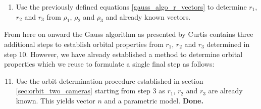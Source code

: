 \documentclass[11pt,a4paper]{article}
\begin{document}
\begin{enumerate}
		\item Use the previously defined equations \ref{gauss_algo_r_vectors} to determine $r_1$, $r_2$ and $r_3$ from $\rho_1$, $\rho_2$ and $\rho_3$ and already known vectors.
	\end{enumerate}
	\cite{curtis_gauss_algo}
	\newline
	From here on onward the Gauss algorithm as presented by Curtis contains three additional steps to establish orbital properties from $r_1$, $r_2$ and $r_3$ determined in step 10. However, we have already established a method to determine orbital properties which we reuse to formulate a single final step as follows:
	
	\begin{enumerate}
		\setcounter{enumi}{10}
		\item Use the orbit determination procedure established in section \ref{sec:orbit_two_cameras} starting from step 3 as $r_1$, $r_2$ and $r_3$ are already known. This yields vector $n$ and a parametric model.\newline
		\textbf{Done.}
	\end{enumerate}
	
	
	
\end{document}
